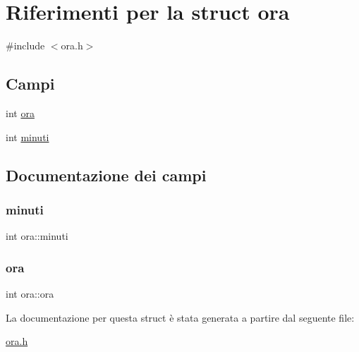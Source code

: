 \hypertarget{structora}{}\section{Riferimenti per la struct ora}
\label{structora}


{\ttfamily \#include $<$ora.\+h$>$}

\subsection*{Campi}
\begin{DoxyCompactItemize}
\item 
int \hyperlink{structora_a7f616357cb909ca1028fd0c3780c24eb}{ora}
\item 
int \hyperlink{structora_a458386e13d8a32a1bf60dee738f22c15}{minuti}
\end{DoxyCompactItemize}


\subsection{Documentazione dei campi}
\mbox{\label{structora_a458386e13d8a32a1bf60dee738f22c15}} 
\subsubsection{\texorpdfstring{minuti}{minuti}}
{\footnotesize\ttfamily int ora\+::minuti}

\mbox{\label{structora_a7f616357cb909ca1028fd0c3780c24eb}} 
\subsubsection{\texorpdfstring{ora}{ora}}
{\footnotesize\ttfamily int ora\+::ora}



La documentazione per questa struct è stata generata a partire dal seguente file\+:\begin{DoxyCompactItemize}
\item 
\hyperlink{ora_8h}{ora.\+h}\end{DoxyCompactItemize}
